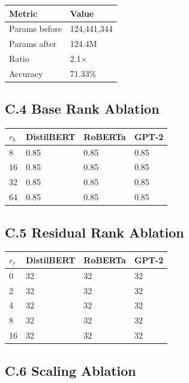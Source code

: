 \begin{table}[H]
\centering
\small
\begin{tabular}{ll}
\toprule
\textbf{Metric} & \textbf{Value} \\
\midrule
Params before & 124,441,344 \\
Params after & 124.4M \\
Ratio & 2.1$\times$ \\
Accuracy & 71.33\% \\
\bottomrule
\end{tabular}
\end{table}

\subsection{C.4 Base Rank Ablation}

\begin{table}[H]
\centering
\small
\begin{tabular}{llll}
\toprule
\textbf{$r_b$} & \textbf{DistilBERT} & \textbf{RoBERTa} & \textbf{GPT-2} \\
\midrule
8 & 0.85 & 0.85 & 0.85 \\
16 & 0.85 & 0.85 & 0.85 \\
32 & 0.85 & 0.85 & 0.85 \\
64 & 0.85 & 0.85 & 0.85 \\
\bottomrule
\end{tabular}
\end{table}

\subsection{C.5 Residual Rank Ablation}

\begin{table}[H]
\centering
\small
\begin{tabular}{llll}
\toprule
\textbf{$r_r$} & \textbf{DistilBERT} & \textbf{RoBERTa} & \textbf{GPT-2} \\
\midrule
0 & 32 & 32 & 32 \\
2 & 32 & 32 & 32 \\
4 & 32 & 32 & 32 \\
8 & 32 & 32 & 32 \\
16 & 32 & 32 & 32 \\
\bottomrule
\end{tabular}
\end{table}

\subsection{C.6 Scaling Ablation}

